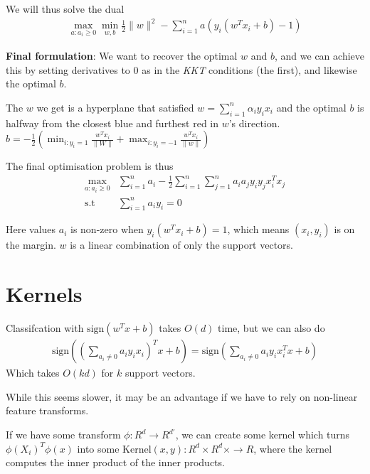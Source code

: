 \documentclass{article}
\begin{document}
    We will thus solve the dual 
    \begin{align}
      \max_{a : a_i \geq 0} \min_{w, b} \frac{1}{2}\lVert w \rVert^2 - \sum_{i=1}^{n}a(y_i(w^T x_i + b)-1) 
    \end{align}
    

    \textbf{Final formulation}:
    We want to recover the optimal $w$ and $b$, and we can achieve this by setting derivatives to $0$ as in the \emph{KKT} conditions (the first), and likewise the optimal $b$. 

    The $w$ we get is a hyperplane that satisfied $w = \sum_{i=1}^{n}\alpha_i y_i x_i$ and the optimal $b$ is halfway from the closest blue and furthest red in $w$'s direction. 
    $b = -\frac{1}{2}(\min_{i: y_i = 1} \frac{w^T x_i}{\lVert W \rVert} + \max_{i:y_i = -1} \frac{w^T x_i}{\lVert w \rVert} )$

    The final optimisation problem is thus
    \begin{align}
      \max_{a : a_i \geq 0} & \sum_{i = 1}^{n} a_i - \frac{1}{2}\sum_{i=1}^{n}\sum_{j=1}^{n} a_i a_j y_i y_j x_i^T x_j \\
      \text{s.t } & \sum_{i=1}^{n} a_i y_i = 0
    \end{align}

    Here values $a_i$ is non-zero when $y_i(w^T x_i + b) = 1$, which means $(x_i, y_i)$ is on the margin. 
    $w$ is a linear combination of only the support vectors.

\section{Kernels}
    Classifcation with $\text{sign}(w^T x + b)$ takes $O(d)$ time, but we can also do 
    \begin{align}
    \text{sign}(
      (\sum_{a_i \neq 0}{a_i y_i x_i})^T x + b
    ) = \text{sign}(
      \sum_{a_i \neq 0} a_i y_i x_i^T x + b
    )
    \end{align}
    Which takes $O(kd)$ for $k$ support vectors. 

    While this seems slower, it may be an advantage if we have to rely on non-linear feature transforms. 

    If we have some transform $\phi : R^d \rightarrow R^{d'}$, we can create some kernel which turns $\phi(X_i)^T \phi(x)$ into some $\text{Kernel}(x, y) : R^d \times R^d \times \rightarrow R$, where the kernel computes the inner product of the inner products. 
\end{document}
